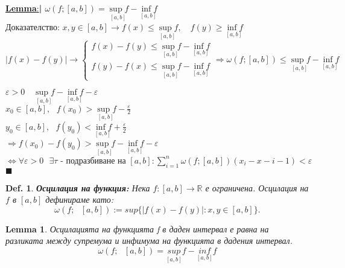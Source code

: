 \documentclass[12pt]{article}
\newtheorem{definition}{Def.}
\newtheorem{lemma}{Lemma}
\newcommand{\spc}{\text{ }}
\newcommand{\halfbox}[1]{\underline{\textbf{#1}:}\textbf{\large{| }}}
\begin{document}
	\halfbox{Lemma} $\omega(f;[a,b])=\underset{[a,b]}{\sup f} - \underset{[a,b]}{\inf f}$\\
	Доказателство: $x,y\in[a,b]\rightarrow f(x)\leq \underset{[a,b]}{\sup f},\quad f(y)\geq \underset{[a,b]}{\inf f}$\\
	\begin{equation*}
		|f(x)-f(y)|\longrightarrow
		\begin{cases}
			f(x)-f(y)\leq\underset{[a,b]}{\sup f}-\underset{[a,b]}{\inf f}\\
			f(y)-f(x)\leq\underset{[a,b]}{\sup f}-\underset{[a,b]}{\inf f}
		\end{cases}
		\Rightarrow\omega(f;[a,b])\leq \underset{[a,b]}{\sup f}-\underset{[a,b]}{\inf f}
	\end{equation*}
	
	$\spc$\\
	$\varepsilon>0\quad \underset{[a,b]}{\sup f}-\underset{[a,b]}{\inf f} - \varepsilon$\\
	$x_0\in[a,b],\spc f(x_0)>\underset{[a,b]}{\sup f}-\frac{\varepsilon}{2}$\\
	$y_0\in[a,b],\spc f(y_0)<\underset{[a,b]}{\inf f}+\frac{\varepsilon}{2}$\\
	$\Rightarrow f(x_0)-f(y_0)>\underset{[a,b]}{\sup f}-\underset{[a,b]}{\inf f}-\varepsilon$\\
	$\spc$
	\\
	$\Leftrightarrow \forall\varepsilon>0 \spc\exists\tau\text{ - подразбиване на }[a,b]:\sum_{i=1}^{n}\omega(f;[a,b])(x_i-x-{i-1})<\varepsilon$
	\hfill $\blacksquare$\\
	
	\begin{definition}
		\textbf{Осцилация на функция:} Нека $f:[a,b]\rightarrow\mathbb{R}$ е ограничена. Осцилация на $f$ в $[a,b]$ дефинираме като:\\
		\[\omega(f;\spc[a,b]) := sup\{|f(x) - f(y)| : x,y\in [a,b]\}.\]
	\end{definition}
	
	\begin{lemma}
		Осцилацията на функцията f в даден интервал е равна на разликата между супремума и инфимума на функцията в дадения интервал.
		\[\omega(f;\spc[a,b]) = \underset{\left[a, b\right]}{sup} f - \underset{\left[a, b\right]}{inf} f\]
	\end{lemma}
%
%
\end{document}
